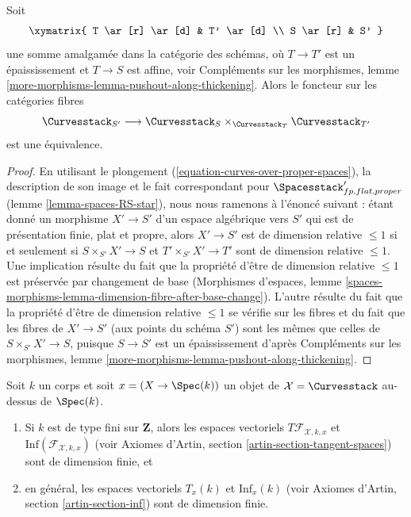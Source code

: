 \begin{lemma}
\label{lemma-curves-RS-star}
Soit
$$
\xymatrix{
T \ar[r] \ar[d] & T' \ar[d] \\
S \ar[r] & S'
}
$$
une somme amalgamée dans la catégorie des schémas, où
$T \to T'$ est un épaississement et $T \to S$ est affine, voir
Compléments sur les morphismes, lemme
\ref{more-morphisms-lemma-pushout-along-thickening}.
Alors le foncteur sur les catégories fibres
$$
\Curvesstack_{S'}
\longrightarrow
\Curvesstack_S
\times_{\Curvesstack_T}
\Curvesstack_{T'}
$$
est une équivalence.
\end{lemma}

\begin{proof}
En utilisant le plongement (\ref{equation-curves-over-proper-spaces}),
la description de son image et le fait correspondant pour
$\Spacesstack'_{fp, flat, proper}$ (lemme \ref{lemma-spaces-RS-star}),
nous nous ramenons à l'énoncé suivant : étant donné un morphisme
$X' \to S'$ d'un espace algébrique vers $S'$ qui est de présentation finie,
plat et propre, alors $X' \to S'$ est de dimension relative $\leq 1$ si et
seulement si $S \times_{S'} X' \to S$ et
$T' \times_{S'} X' \to T'$ sont de dimension relative $\leq 1$.
Une implication résulte du fait que la propriété d'être de dimension relative
$\leq 1$ est préservée par changement de base
(Morphismes d'espaces, lemme
\ref{spaces-morphisms-lemma-dimension-fibre-after-base-change}).
L'autre résulte du fait que la propriété d'être de dimension relative
$\leq 1$ se vérifie sur les fibres et du fait que les fibres de $X' \to S'$
(aux points du schéma $S'$) sont les mêmes que celles de
$S \times_{S'} X' \to S$, puisque $S \to S'$ est un épaississement d'après
Compléments sur les morphismes, lemme
\ref{more-morphisms-lemma-pushout-along-thickening}.
\end{proof}

\begin{lemma}
\label{lemma-curves-tangent-space}
Soit $k$ un corps et soit $x = (X \to \Spec(k))$ un objet de
$\mathcal{X} = \Curvesstack$ au-dessus de $\Spec(k)$.
\begin{enumerate}
\item Si $k$ est de type fini sur $\mathbf{Z}$, alors les espaces vectoriels
$T\mathcal{F}_{\mathcal{X}, k, x}$ et
$\text{Inf}(\mathcal{F}_{\mathcal{X}, k, x})$
(voir Axiomes d'Artin, section \ref{artin-section-tangent-spaces})
sont de dimension finie, et
\item en général, les espaces vectoriels $T_x(k)$ et $\text{Inf}_x(k)$
(voir Axiomes d'Artin, section \ref{artin-section-inf})
sont de dimension finie.
\end{enumerate}
\end{lemma}

